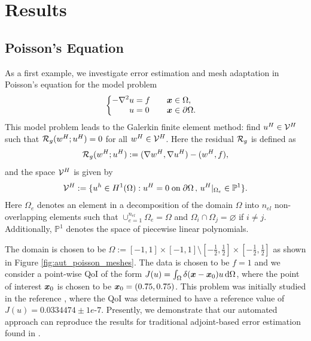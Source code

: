 \section{Results}

\subsection{Poisson's Equation}

As a first example, we investigate error estimation and mesh adaptation
in Poisson's equation for the model problem
%
\begin{gather}
\begin{cases}
\begin{aligned}
- \nabla^2 u &= f \quad && \boldsymbol{x} \in \Omega, \\
u &= 0 \quad && \boldsymbol{x} \in \partial \Omega.
\end{aligned}
\end{cases}
\end{gather}
%
This model problem leads to the Galerkin finite element method: find
$u^H \in \mathcal{V}^H$ such that $\mathcal{R}_g(w^H; u^H) = 0$ for all $w^H \in \mathcal{V}^H$.
Here the residual $\mathcal{R}_g$ is defined as
%
\begin{gather}
\mathcal{R}_g(w^H; u^H) := (\nabla w^H, \nabla u^H) - (w^H, f),
\end{gather}
%
and the space $\mathcal{V}^H$ is given by
%
\begin{gather}
\mathcal{V}^H := \{ u^h \in H^1(\Omega) :
u^H = 0 \; \text{on} \; \partial \Omega \, , \,
u^H |_{\Omega_e} \in \mathbb{P}^1 \}.
\label{eq:aut_poisson_space}
\end{gather}
%
Here $\Omega_e$ denotes an element in a decomposition of the
domain $\Omega$ into $n_{el}$ non-overlapping elements such that
$\cup_{e=1}^{n_{el}} \Omega_e = \Omega$ and
$\Omega_i \cap \Omega_j = \varnothing$ if $i \neq j$.
Additionally,  $\mathbb{P}^1$ denotes the space of piecewise linear
polynomials.

The domain is chosen to be
$\Omega := [-1,1] \times [-1,1] \setminus
[-\frac12, \frac12] \times [-\frac12, \frac12]$ as shown in
Figure \ref{fig:aut_poisson_meshes}. The data is chosen to be
$f=1$ and we consider a point-wise
QoI of the form
$J(u) = \int_{\Omega} \delta(\boldsymbol{x} - \boldsymbol{x}_0) u \, \text{d} \Omega$,
where the point of interest $\boldsymbol{x}_0$ is chosen to be
$\boldsymbol{x}_0 = (0.75, 0.75)$. This problem was initially studied in
the reference \cite{dealiistep14}, where the QoI was determined
to have a reference value of $J(u) = 0.0334474 \pm 1e\mbox{-}7$.
Presently, we demonstrate that our automated approach can
reproduce the results for traditional adjoint-based error estimation
found in \cite{dealiistep14}.

